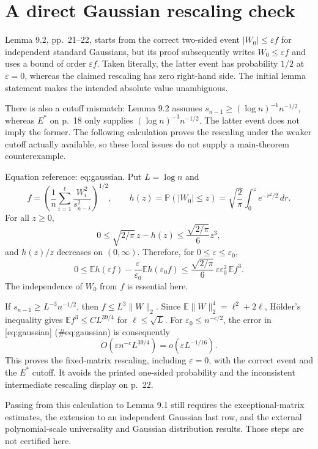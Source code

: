 \documentclass[10pt]{article}
\begin{document}
\section*{A direct Gaussian rescaling check}
Lemma 9.2, pp. 21–22, starts from the correct two-sided event \(|W_0|\leq\varepsilon f\) for independent standard Gaussians, but its proof subsequently writes \(W_0\leq\varepsilon f\) and uses a bound of order \(\varepsilon f\). Taken literally, the latter event has probability \(1/2\) at \(\varepsilon=0\), whereas the claimed rescaling has zero right-hand side. The initial lemma statement makes the intended absolute value unambiguous.\par
There is also a cutoff mismatch: Lemma 9.2 assumes \(s_{n-1}\geq(\log n)^{-1}n^{-1/2}\), whereas \(E^*\) on p. 18 only supplies \((\log n)^{-3}n^{-1/2}\). The latter event does not imply the former. The following calculation proves the rescaling under the weaker cutoff actually available, so these local issues do not supply a main-theorem counterexample.\par
Equation reference: eq:gaussian. Put \(L=\log n\) and \[f=\left(\frac1n\sum_{i=1}^{\ell}\frac{W_i^2}{s_{n-i}^2}\right)^{1/2},
 \qquad h(z)=\mathbb P(|W_0|\leq z)
            =\sqrt{\frac2\pi}\int_0^z e^{-r^2/2}\,dr .\] For all \(z\geq0\), \[0\leq \sqrt{2/\pi}\,z-h(z)\leq \frac{\sqrt{2/\pi}}6z^3,\] and \(h(z)/z\) decreases on \((0,\infty)\). Therefore, for \(0\leq\varepsilon\leq\varepsilon_0\), \[0\leq \mathbb E h(\varepsilon f)
       -\frac{\varepsilon}{\varepsilon_0}\mathbb E h(\varepsilon_0f)
 \leq \frac{\sqrt{2/\pi}}6\,
          \varepsilon\varepsilon_0^2\,\mathbb E f^3.
 \] The independence of \(W_0\) from \(f\) is essential here.\par
If \(s_{n-1}\geq L^{-3}n^{-1/2}\), then \(f\leq L^3\|W\|_2\). Since \(\mathbb E\|W\|_2^4=\ell^2+2\ell\), Hölder’s inequality gives \(\mathbb Ef^3\leq C L^{39/4}\) for \(\ell\leq\sqrt L\). For \(\varepsilon_0\leq n^{-c/2}\), the error in [eq:gaussian] (\#eq:gaussian) is consequently \[O\!\left(\varepsilon n^{-c}L^{39/4}\right)
   =o\!\left(\varepsilon L^{-1/16}\right).\] This proves the fixed-matrix rescaling, including \(\varepsilon=0\), with the correct event and the \(E^*\) cutoff. It avoids the printed one-sided probability and the inconsistent intermediate rescaling display on p. 22.\par
Passing from this calculation to Lemma 9.1 still requires the exceptional-matrix estimates, the extension to an independent Gaussian last row, and the external polynomial-scale universality and Gaussian distribution results. Those steps are not certified here.\par
\end{document}

